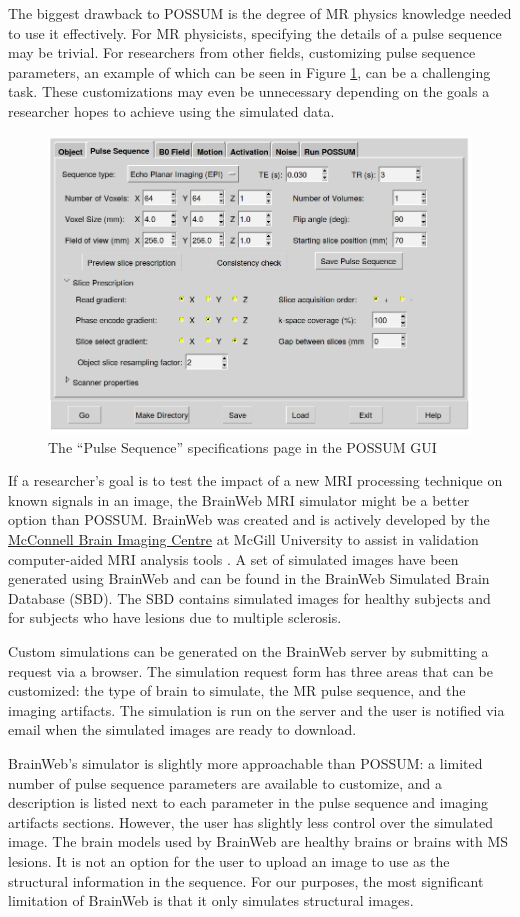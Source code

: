 The biggest drawback to POSSUM is the degree of MR physics knowledge needed to use it effectively. For MR physicists, specifying the details of a pulse sequence may be trivial. For researchers from other fields, customizing pulse sequence parameters, an example of which can be seen in Figure \ref{fig:possum}, can be a challenging task. These customizations may even be unnecessary depending on the goals a researcher hopes to achieve using the simulated data.

\begin{figure}
\centering
\includegraphics[width=.6\textwidth]{7/possum-gui.png}
\caption{The ``Pulse Sequence'' specifications page in the POSSUM GUI}
\label{fig:possum}
\end{figure}


If a researcher's goal is to test the impact of a new MRI processing technique on known signals in an image, the BrainWeb MRI simulator might be a better option than POSSUM. BrainWeb was created and is actively developed by the \href{mcgill.ca/bic/}{McConnell Brain Imaging Centre} at McGill University to assist in validation computer-aided MRI analysis tools \cite{kwan1999mri} \cite{collins1998design} \cite{cocosco1997brainweb} \cite{kwan1996extensible}. A set of simulated images have been generated using BrainWeb and can be found in the BrainWeb Simulated Brain Database (SBD). The SBD contains simulated images for healthy subjects and for subjects who have lesions due to multiple sclerosis.

Custom simulations can be generated on the BrainWeb server by submitting a request via a browser. The simulation request form has three areas that can be customized: the type of brain to simulate, the MR pulse sequence, and the imaging artifacts. The simulation is run on the server and the user is notified via email when the simulated images are ready to download. 

BrainWeb's simulator is slightly more approachable than POSSUM: a limited number of pulse sequence parameters are available to customize, and a description is listed next to each parameter in the pulse sequence and imaging artifacts sections. However, the user has slightly less control over the simulated image. The brain models used by BrainWeb are healthy brains or brains with MS lesions. It is not an option for the user to upload an image to use as the structural information in the sequence. For our purposes, the most significant limitation of BrainWeb is that it only simulates structural images. 

